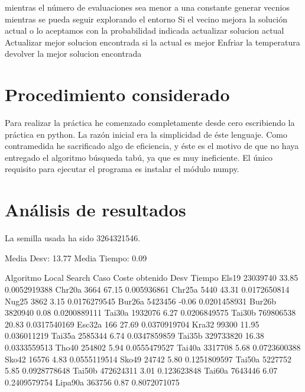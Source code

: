 \documentclass[10pt,a4paper]{article}
\begin{document}
\begin{ccode}
    mientras el número de evaluaciones sea menor a una constante
        generar vecnios mientras se pueda seguir explorando el entorno
            Si el vecino mejora la solución actual o lo aceptamos con la probabilidad indicada
                actualizar solucion actual
                Actualizar mejor solucion encontrada si la actual es mejor
            Enfriar la temperatura
    devolver la mejor solucion encontrada
\end{ccode}

\section{Procedimiento considerado}

Para realizar la práctica he comenzado completamente desde cero escribiendo la práctica en python. La razón inicial era la simplicidad de éste lenguaje. Como contramedida he sacrificado algo de eficiencia, y éste es el motivo de que no haya entregado el algoritmo búsqueda tabú, ya que es muy ineficiente\cite{q1}. El único requisito para ejecutar el programa es instalar el módulo numpy.

\section{Análisis de resultados}

La semilla usada ha sido 3264321546.

\begin{ccode}
    
Media Desv: 13.77
Media Tiempo: 0.09
    
Algoritmo Local Search          
Caso    Coste obtenido  Desv    Tiempo
Els19   23039740    33.85   0.0052919388
Chr20a  3664    67.15   0.005936861
Chr25a  5440    43.31   0.0172650814
Nug25   3862    3.15    0.0176279545
Bur26a  5423456 -0.06   0.0201458931
Bur26b  3820940 0.08    0.0200889111
Tai30a  1932076 6.27    0.0206849575
Tai30b  769806538   20.83   0.0317540169
Esc32a  166 27.69   0.0370919704
Kra32   99300   11.95   0.036011219
Tai35a  2585344 6.74    0.0347859859
Tai35b  329733820   16.38   0.0333559513
Tho40   254802  5.94    0.0555479527
Tai40a  3317708 5.68    0.0723600388
Sko42   16576   4.83    0.0555119514
Sko49   24742   5.80    0.1251809597
Tai50a  5227752 5.85    0.0928778648
Tai50b  472624311   3.01    0.123623848
Tai60a  7643446 6.07    0.2409579754
Lipa90a 363756  0.87    0.8072071075
\end{ccode}
\end{document}
